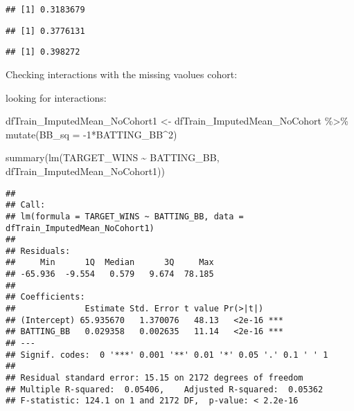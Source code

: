 \documentclass[
]{article}
\newenvironment{Shaded}{\begin{snugshade}}{\end{snugshade}}
\newcommand{\AttributeTok}[1]{\textcolor[rgb]{0.77,0.63,0.00}{#1}}
\newcommand{\DecValTok}[1]{\textcolor[rgb]{0.00,0.00,0.81}{#1}}
\newcommand{\FunctionTok}[1]{\textcolor[rgb]{0.00,0.00,0.00}{#1}}
\newcommand{\NormalTok}[1]{#1}
\newcommand{\OtherTok}[1]{\textcolor[rgb]{0.56,0.35,0.01}{#1}}
\newcommand{\SpecialCharTok}[1]{\textcolor[rgb]{0.00,0.00,0.00}{#1}}
\begin{document}
\begin{verbatim}
## [1] 0.3183679
\end{verbatim}

\begin{Shaded}
\end{Shaded}

\begin{verbatim}
## [1] 0.3776131
\end{verbatim}

\begin{Shaded}
\end{Shaded}

\begin{verbatim}
## [1] 0.398272
\end{verbatim}

Checking interactions with the missing vaolues cohort:

looking for interactions:

\begin{Shaded}
\begin{Highlighting}[]
\NormalTok{dfTrain\_ImputedMean\_NoCohort1 }\OtherTok{\textless{}{-}}\NormalTok{ dfTrain\_ImputedMean\_NoCohort }\SpecialCharTok{\%\textgreater{}\%}
  \FunctionTok{mutate}\NormalTok{(}\AttributeTok{BB\_sq =} \SpecialCharTok{{-}}\DecValTok{1}\SpecialCharTok{*}\NormalTok{BATTING\_BB}\SpecialCharTok{\^{}}\DecValTok{2}\NormalTok{)}

\FunctionTok{summary}\NormalTok{(}\FunctionTok{lm}\NormalTok{(TARGET\_WINS }\SpecialCharTok{\textasciitilde{}}\NormalTok{ BATTING\_BB, dfTrain\_ImputedMean\_NoCohort1))}
\end{Highlighting}
\end{Shaded}

\begin{verbatim}
## 
## Call:
## lm(formula = TARGET_WINS ~ BATTING_BB, data = dfTrain_ImputedMean_NoCohort1)
## 
## Residuals:
##     Min      1Q  Median      3Q     Max 
## -65.936  -9.554   0.579   9.674  78.185 
## 
## Coefficients:
##              Estimate Std. Error t value Pr(>|t|)    
## (Intercept) 65.935670   1.370076   48.13   <2e-16 ***
## BATTING_BB   0.029358   0.002635   11.14   <2e-16 ***
## ---
## Signif. codes:  0 '***' 0.001 '**' 0.01 '*' 0.05 '.' 0.1 ' ' 1
## 
## Residual standard error: 15.15 on 2172 degrees of freedom
## Multiple R-squared:  0.05406,    Adjusted R-squared:  0.05362 
## F-statistic: 124.1 on 1 and 2172 DF,  p-value: < 2.2e-16
\end{verbatim}
\end{document}
